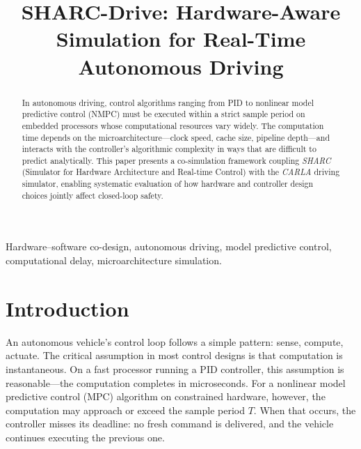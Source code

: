 \documentclass[conference]{IEEEtran}
\begin{document}
\title{SHARC-Drive: Hardware-Aware Simulation for Real-Time Autonomous Driving}

\author{
}

\maketitle

\begin{abstract}
  In autonomous driving, control algorithms ranging from PID to
  nonlinear model predictive control (NMPC) must be executed within a
  strict sample period on embedded processors whose computational
  resources vary widely.  The computation time depends on the
  microarchitecture---clock speed, cache size, pipeline depth---and
  interacts with the controller's algorithmic complexity in ways that
  are difficult to predict analytically.  This paper presents a
  co-simulation framework coupling \emph{SHARC} (Simulator for
  Hardware Architecture and Real-time Control) with the \emph{CARLA}
  driving simulator, enabling systematic evaluation of how hardware
  and controller design choices jointly affect closed-loop safety.
\end{abstract}

\begin{IEEEkeywords}
  Hardware--software co-design, autonomous driving, model predictive
  control, computational delay, microarchitecture simulation.
\end{IEEEkeywords}

\section{Introduction}\label{sec:intro}
An autonomous vehicle's control loop follows a simple pattern:
sense, compute, actuate.  The critical assumption in most control
designs is that computation is instantaneous.  On a fast processor
running a PID controller, this assumption is reasonable---the
computation completes in microseconds.  For a nonlinear model
predictive control (MPC) algorithm on constrained hardware, however,
the computation may approach or exceed the sample period $T$.
When that occurs, the controller misses its deadline: no fresh
command is delivered, and the vehicle continues executing the
previous one.
\end{document}
